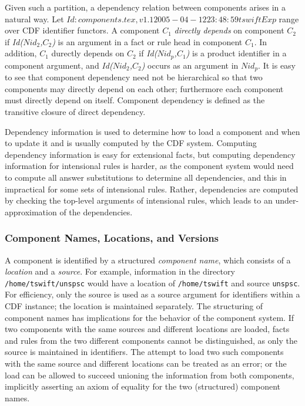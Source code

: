 Given such a partition, a dependency relation between components
arises in a natural way.  Let $Id: components.tex,v 1.1 2005-04-12 23:48:59 tswift Exp $ range over CDF identifier functors.
A component $C_1$ {\em directly depends} on component $C_2$ if {\em
Id($Nid_2$,$C_2$)} is an argument in a fact or rule head in component
$C_1$.  In addition, $C_1$ durectly depends on $C_2$ if {\em
Id($Nid_p$,$C_1$)} is a product identifier in a component argument,
and {\em Id($Nid_2$,$C_2$)} occurs as an argument in $Nid_p$.  It is
easy to see that component dependency need not be hierarchical so that
two components may directly depend on each other; furthermore each
component must directly depend on itself.  Component dependency is
defined as the transitive closure of direct dependency.

Dependency information is used to determine how to load a component
and when to update it and is usually computed by the CDF system.
Computing dependency information is easy for extensional facts, but
computing dependency information for intensional rules is harder, as
the component system would need to compute all answer substitutions to
determine all dependencies, and this in impractical for some sets of
intensional rules.  Rather, dependencies are computed by checking the
top-level arguments of intensional rules, which leads to an
under-approximation of the dependencies.

\subsubsection{Component Names, Locations, and Versions}

A component is identified by a structured {\em component name}, which
consists of a {\em location} and a {\em source}.  For example,
information in the directory {\tt /home/tswift/unspsc} would have a
location of {\tt /home/tswift} and source {\tt unspsc}.  For
efficiency, only the source is used as a source argument for
identifiers within a CDF instance; the location is maintained
separately.  The structuring of component names has implications for
the behavior of the component system.  If two components with the same
sources and different locations are loaded, facts and rules from the
two different components cannot be distinguished, as only the source
is maintained in identifiers.  The attempt to load two such components
with the same source and different locations can be treated as an
error; or the load can be allowed to succeed unioning the information
from both components, implicitly asserting an axiom of equality for
the two (structured) component names.

